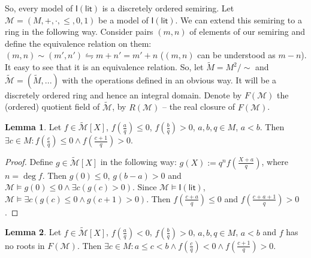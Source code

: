 \documentclass[a4paper,14pt]{article}
\theoremstyle{definition}
\theoremstyle{theorem}
\theoremstyle{lemma}
\newtheorem{lemma}{Lemma}[section]
\theoremstyle{proposition}
\theoremstyle{remark}
\theoremstyle{corollary}
\theoremstyle{problem}
\theoremstyle{hypothesis}
\begin{document}
So, every model of $\mathsf{I(lit)}$ is a discretely ordered semiring. Let $\mathcal M = (M, +, \cdot, \leqslant, 0, 1)$ be a model of $\mathsf{I(lit)}$. We can extend this semiring to a ring in the following way. Consider pairs $(m, n)$ of elements of our semiring and define the equivalence relation on them: $(m, n) \sim (m', n') \leftrightharpoons m + n' = m' + n$ ($(m, n)$ can be understood as $m - n$). It easy to see that it is an equivalence relation. So, let $\widetilde{M} = M^2 / \sim$ and $\widetilde {\mathcal M} = (\widetilde{M}, ...)$ with the operations defined in an obvious way. It will be a discretely ordered ring and hence an integral domain. Denote by $F(\mathcal M)$ the (ordered) quotient field of $\widetilde{\mathcal M}$, by $R(\mathcal M)$ -- the real closure of $F(\mathcal M)$.

\begin{lemma}
    Let $f \in \widetilde{\mathcal M}[X]$, $f(\frac{a}{q}) \leqslant 0$, $f(\frac{b}{q}) > 0$, $a, b, q \in M$, $a < b$. Then $\exists c \in M: f(\frac{c}{q}) \leqslant 0 \wedge f(\frac{c + 1}{q}) > 0$.
\end{lemma}

\begin{proof}
    Define $g \in \widetilde{\mathcal M}[X]$ in the following way: $g(X) := q^n f(\frac{X + a}{q})$, where $n = \deg f$. Then $g(0) \leqslant 0$, $g(b - a) > 0$ and $\mathcal M \vDash g(0) \leqslant 0 \wedge \exists c (g(c) > 0)$. Since $\mathcal M \vDash \mathsf{I(lit)}$, $\mathcal M \vDash \exists c (g(c) \leqslant 0 \wedge g(c + 1) > 0)$. Then $f(\frac{c + a}{q}) \leqslant 0$ and $f(\frac{c + a + 1}{q}) > 0$.
\end{proof}

\begin{lemma}
    Let $f \in \widetilde{\mathcal M}[X]$, $f(\frac{a}{q}) < 0$, $f(\frac{b}{q}) > 0$, $a, b, q \in M$, $a < b$ and $f$ has no roots in $F(\mathcal M)$. Then $\exists c \in M: a \leqslant c < b \wedge f(\frac{c}{q}) < 0 \wedge f(\frac{c + 1}{q}) > 0$.
\end{lemma}
\end{document}

